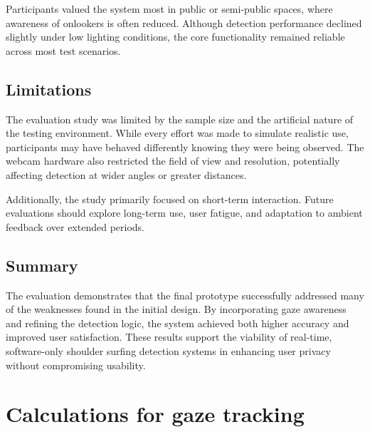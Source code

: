 \documentclass[12pt]{article}
\theoremstyle{plain}
\theoremstyle{definition}
\begin{document}
Participants valued the system most in public or semi-public spaces, where awareness of onlookers is often reduced. Although detection performance declined slightly under low lighting conditions, the core functionality remained reliable across most test scenarios.

\subsection{Limitations}
The evaluation study was limited by the sample size and the artificial nature of the testing environment. While every effort was made to simulate realistic use, participants may have behaved differently knowing they were being observed. The webcam hardware also restricted the field of view and resolution, potentially affecting detection at wider angles or greater distances.

Additionally, the study primarily focused on short-term interaction. Future evaluations should explore long-term use, user fatigue, and adaptation to ambient feedback over extended periods.

\subsection{Summary}
The evaluation demonstrates that the final prototype successfully addressed many of the weaknesses found in the initial design. By incorporating gaze awareness and refining the detection logic, the system achieved both higher accuracy and improved user satisfaction. These results support the viability of real-time, software-only shoulder surfing detection systems in enhancing user privacy without compromising usability.

\printbibliography 

\clearpage\appendix

\section{Calculations for gaze tracking}
\label{app:gaze_calcs}


\end{document}

